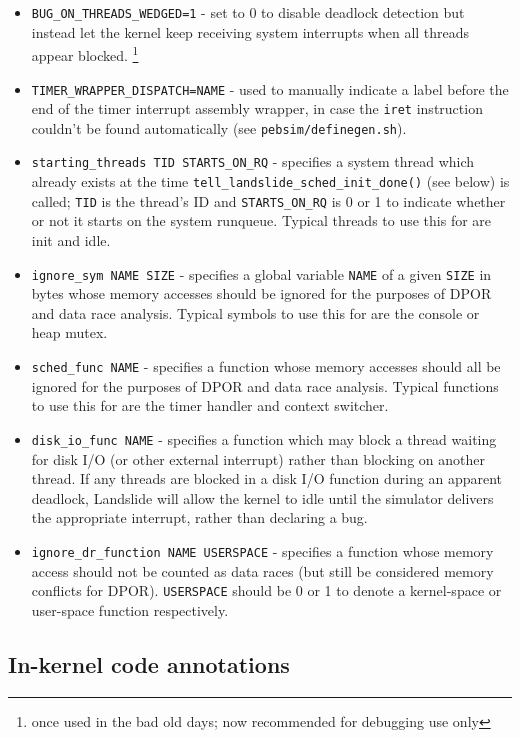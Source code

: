 \begin{itemize}
	\item {\tt BUG\_ON\_THREADS\_WEDGED=1} - set to 0 to disable deadlock detection but instead let the kernel keep receiving system interrupts when all threads appear blocked.%
		\footnote{once used in the bad old days; now recommended for debugging use only}
	\item {\tt TIMER\_WRAPPER\_DISPATCH=NAME} - used to manually indicate a label before the end of the timer interrupt assembly wrapper, in case the {\tt iret} instruction couldn't be found automatically (see {\tt pebsim/definegen.sh}).
	\item {\tt starting\_threads TID STARTS\_ON\_RQ} - specifies a system thread which already exists at the time {\tt tell\_landslide\_sched\_init\_done()} (see below) is called; {\tt TID} is the thread's ID and {\tt STARTS\_ON\_RQ} is 0 or 1 to indicate whether or not it starts on the system runqueue.
		Typical threads to use this for are init and idle.
	\item {\tt ignore\_sym NAME SIZE} - specifies a global variable {\tt NAME} of a given {\tt SIZE} in bytes whose memory accesses should be ignored for the purposes of DPOR and data race analysis.
		Typical symbols to use this for are the console or heap mutex.
	\item {\tt sched\_func NAME} - specifies a function whose memory accesses should all be ignored for the purposes of DPOR and data race analysis.
		Typical functions to use this for are the timer handler and context switcher.
	\item {\tt disk\_io\_func NAME} - specifies a function which may block a thread waiting for disk I/O (or other external interrupt) rather than blocking on another thread.
		If any threads are blocked in a disk I/O function during an apparent deadlock,
		Landslide will allow the kernel to idle until the simulator delivers the appropriate interrupt,
		rather than declaring a bug.
	\item {\tt ignore\_dr\_function NAME USERSPACE} - specifies a function whose memory access should not be counted as data races (but still be considered memory conflicts for DPOR).
		{\tt USERSPACE} should be 0 or 1 to denote a kernel-space or user-space function respectively.
\end{itemize}

\subsection{In-kernel code annotations}

